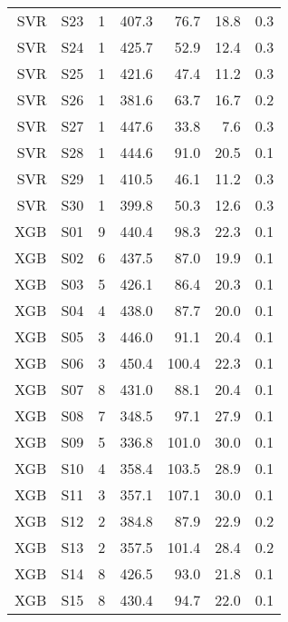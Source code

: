 \begin{table}
\begin{tabular}{rrrrrrr}
  SVR &  S23 &             1 &   407.3 &  76.7 &         18.8 &    0.3 \\
  SVR &  S24 &             1 &   425.7 &  52.9 &         12.4 &    0.3 \\
  SVR &  S25 &             1 &   421.6 &  47.4 &         11.2 &    0.3 \\
  SVR &  S26 &             1 &   381.6 &  63.7 &         16.7 &    0.2 \\
  SVR &  S27 &             1 &   447.6 &  33.8 &          7.6 &    0.3 \\
  SVR &  S28 &             1 &   444.6 &  91.0 &         20.5 &    0.1 \\
  SVR &  S29 &             1 &   410.5 &  46.1 &         11.2 &    0.3 \\
  SVR &  S30 &             1 &   399.8 &  50.3 &         12.6 &    0.3 \\
  XGB &  S01 &             9 &   440.4 &  98.3 &         22.3 &    0.1 \\
  XGB &  S02 &             6 &   437.5 &  87.0 &         19.9 &    0.1 \\
  XGB &  S03 &             5 &   426.1 &  86.4 &         20.3 &    0.1 \\
  XGB &  S04 &             4 &   438.0 &  87.7 &         20.0 &    0.1 \\
  XGB &  S05 &             3 &   446.0 &  91.1 &         20.4 &    0.1 \\
  XGB &  S06 &             3 &   450.4 & 100.4 &         22.3 &    0.1 \\
  XGB &  S07 &             8 &   431.0 &  88.1 &         20.4 &    0.1 \\
  XGB &  S08 &             7 &   348.5 &  97.1 &         27.9 &    0.1 \\
  XGB &  S09 &             5 &   336.8 & 101.0 &         30.0 &    0.1 \\
  XGB &  S10 &             4 &   358.4 & 103.5 &         28.9 &    0.1 \\
  XGB &  S11 &             3 &   357.1 & 107.1 &         30.0 &    0.1 \\
  XGB &  S12 &             2 &   384.8 &  87.9 &         22.9 &    0.2 \\
  XGB &  S13 &             2 &   357.5 & 101.4 &         28.4 &    0.2 \\
  XGB &  S14 &             8 &   426.5 &  93.0 &         21.8 &    0.1 \\
  XGB &  S15 &             8 &   430.4 &  94.7 &         22.0 &    0.1 \\

\end{tabular}
\end{table}
